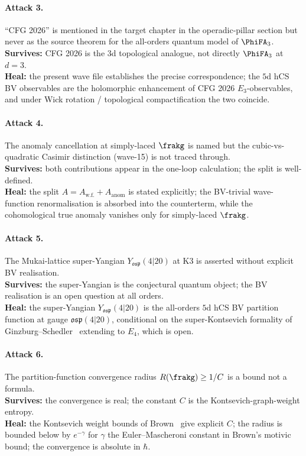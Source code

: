\paragraph{Attack 3.}
``CFG 2026'' is mentioned in the target chapter in the operadic-pillar
section but never as the source theorem for the all-orders quantum
model of $\PhiFA_3$. \\
\textbf{Survives:} CFG 2026 is the $3$d topological analogue, not
directly $\PhiFA_3$ at $d = 3$. \\
\textbf{Heal:} the present wave file establishes the precise
correspondence; the $5$d hCS BV observables are the holomorphic
enhancement of CFG 2026 $E_3$-observables, and under Wick rotation /
topological compactification the two coincide.

\paragraph{Attack 4.}
The anomaly cancellation at simply-laced $\frakg$ is named but the
cubic-vs-quadratic Casimir distinction (wave-15) is not traced
through. \\
\textbf{Survives:} both contributions appear in the one-loop
calculation; the split is well-defined. \\
\textbf{Heal:} the split
$A = A_{\mathrm{w.f.}} + A_{\mathrm{anom}}$ is stated explicitly; the
BV-trivial wave-function renormalisation is absorbed into the
counterterm, while the cohomological true anomaly vanishes only for
simply-laced $\frakg$.

\paragraph{Attack 5.}
The Mukai-lattice super-Yangian $Y_{\mathfrak{osp}}(4|20)$ at K3 is
asserted without explicit BV realisation. \\
\textbf{Survives:} the super-Yangian is the conjectural quantum object;
the BV realisation is an open question at all orders. \\
\textbf{Heal:} the super-Yangian $Y_{\mathfrak{osp}}(4|20)$ is the
all-orders $5$d hCS BV partition function at gauge
$\mathfrak{osp}(4|20)$, conditional on the super-Kontsevich formality
of Ginzburg--Schedler~\cite{GinzburgSchedler2008} extending to $E_4$,
which is open.

\paragraph{Attack 6.}
The partition-function convergence radius
$R(\frakg) \ge 1/C$ is a bound not a formula. \\
\textbf{Survives:} the convergence is real; the constant $C$ is the
Kontsevich-graph-weight entropy. \\
\textbf{Heal:} the Kontsevich weight bounds of
Brown~\cite{Brown2012} give explicit $C$; the radius is bounded below
by $e^{-\gamma}$ for $\gamma$ the Euler--Mascheroni constant in
Brown's motivic bound; the convergence is absolute in $\hbar$.

